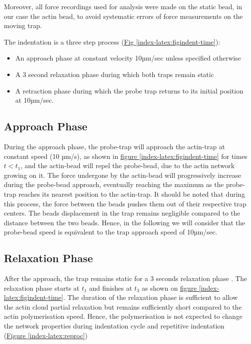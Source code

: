 \documentclass[A4paperpaper,11pt,english]{sphinxmanual}
\begin{document}
Moreover, all force
recordings used for analysis were made on the static bead, in our case the actin bead, to avoid systematic errors of force measurements on the moving trap.

The indentation is a three step process (\hyperref[index-latex:figindent-time]{Fig  \ref*{index-latex:figindent-time}}):
\begin{itemize}
\item {} 
An approach phase at constant velocity 10µm/sec unless specified otherwise

\item {} 
A 3 second relaxation phase during which both traps remain static

\item {} 
A retraction phase  during which the probe trap returns to its initial position at 10µm/sec.

\end{itemize}


\subsection{Approach Phase}
\label{index-latex:approach-phase}
During the approach phase, the probe-trap will approach the actin-trap at constant speed (10 µm/s), as shown in
\hyperref[index-latex:figindent-time]{figure  \ref*{index-latex:figindent-time}} for times \(t < t_1\), and the actin-bead
will repel the probe-bead, due to the actin network growing on it. The force undergone
by the actin-bead will progressively increase during the probe-bead approach,
eventually reaching the maximum as the probe-trap reaches its nearest position
to the actin-trap. It should be noted that during this process,
the force between the beads pushes  them out of their respective trap centers.
The beads displacement in the trap remains negligible compared to the
distance between the two beads. Hence, in the following we will consider that the probe-bead speed is equivalent to the trap approach speed of 10µm/sec.


\subsection{Relaxation Phase}
\label{index-latex:relaxation-phase}
After the approach, the trap remains static for a 3 seconds relaxation phase
. The relaxation phase starts at \(t_1\) and
finishes at \(t_3\) as shown on \hyperref[index-latex:figindent-time]{figure  \ref*{index-latex:figindent-time}}. The duration of the relaxation phase is sufficient to allow the actin cloud  partial
relaxation but remains sufficiently short compared to
the actin polymerisation speed. Hence, the polymerisation is not expected to
change the network properties during indentation cycle and repetitive indentation (\hyperref[index-latex:reproc]{Figure  \ref*{index-latex:reproc}})
\end{document}
